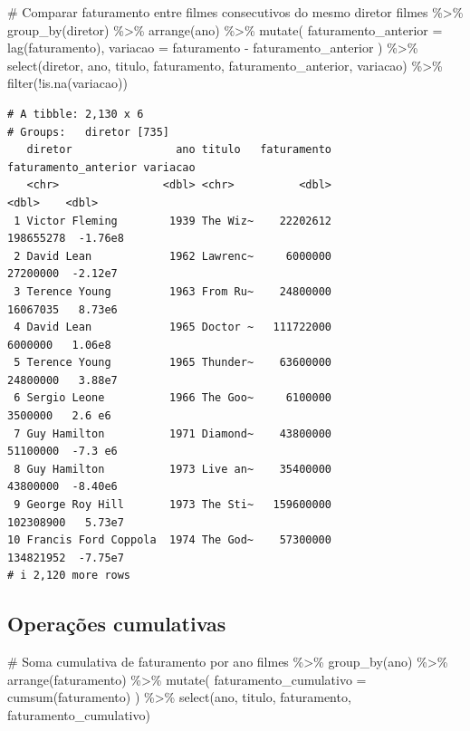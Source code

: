 \documentclass[
  letterpaper,
]{scrbook}
\newenvironment{Shaded}{\begin{snugshade}}{\end{snugshade}}
\newcommand{\AttributeTok}[1]{\textcolor[rgb]{0.40,0.45,0.13}{#1}}
\newcommand{\CommentTok}[1]{\textcolor[rgb]{0.37,0.37,0.37}{#1}}
\newcommand{\FunctionTok}[1]{\textcolor[rgb]{0.28,0.35,0.67}{#1}}
\newcommand{\NormalTok}[1]{\textcolor[rgb]{0.00,0.23,0.31}{#1}}
\newcommand{\SpecialCharTok}[1]{\textcolor[rgb]{0.37,0.37,0.37}{#1}}
\begin{document}
\begin{Shaded}
\begin{Highlighting}[]
\CommentTok{\# Comparar faturamento entre filmes consecutivos do mesmo diretor}
\NormalTok{filmes }\SpecialCharTok{\%\textgreater{}\%} 
  \FunctionTok{group\_by}\NormalTok{(diretor) }\SpecialCharTok{\%\textgreater{}\%} 
  \FunctionTok{arrange}\NormalTok{(ano) }\SpecialCharTok{\%\textgreater{}\%} 
  \FunctionTok{mutate}\NormalTok{(}
    \AttributeTok{faturamento\_anterior =} \FunctionTok{lag}\NormalTok{(faturamento),}
    \AttributeTok{variacao =}\NormalTok{ faturamento }\SpecialCharTok{{-}}\NormalTok{ faturamento\_anterior}
\NormalTok{  ) }\SpecialCharTok{\%\textgreater{}\%} 
  \FunctionTok{select}\NormalTok{(diretor, ano, titulo, faturamento, faturamento\_anterior, variacao) }\SpecialCharTok{\%\textgreater{}\%} 
  \FunctionTok{filter}\NormalTok{(}\SpecialCharTok{!}\FunctionTok{is.na}\NormalTok{(variacao))}
\end{Highlighting}
\end{Shaded}

\begin{verbatim}
# A tibble: 2,130 x 6
# Groups:   diretor [735]
   diretor                ano titulo   faturamento faturamento_anterior variacao
   <chr>                <dbl> <chr>          <dbl>                <dbl>    <dbl>
 1 Victor Fleming        1939 The Wiz~    22202612            198655278  -1.76e8
 2 David Lean            1962 Lawrenc~     6000000             27200000  -2.12e7
 3 Terence Young         1963 From Ru~    24800000             16067035   8.73e6
 4 David Lean            1965 Doctor ~   111722000              6000000   1.06e8
 5 Terence Young         1965 Thunder~    63600000             24800000   3.88e7
 6 Sergio Leone          1966 The Goo~     6100000              3500000   2.6 e6
 7 Guy Hamilton          1971 Diamond~    43800000             51100000  -7.3 e6
 8 Guy Hamilton          1973 Live an~    35400000             43800000  -8.40e6
 9 George Roy Hill       1973 The Sti~   159600000            102308900   5.73e7
10 Francis Ford Coppola  1974 The God~    57300000            134821952  -7.75e7
# i 2,120 more rows
\end{verbatim}

\subsection{Operações cumulativas}\label{operauxe7uxf5es-cumulativas}

\begin{Shaded}
\begin{Highlighting}[]
\CommentTok{\# Soma cumulativa de faturamento por ano}
\NormalTok{filmes }\SpecialCharTok{\%\textgreater{}\%} 
  \FunctionTok{group\_by}\NormalTok{(ano) }\SpecialCharTok{\%\textgreater{}\%} 
  \FunctionTok{arrange}\NormalTok{(faturamento) }\SpecialCharTok{\%\textgreater{}\%} 
  \FunctionTok{mutate}\NormalTok{(}
    \AttributeTok{faturamento\_cumulativo =} \FunctionTok{cumsum}\NormalTok{(faturamento)}
\NormalTok{  ) }\SpecialCharTok{\%\textgreater{}\%} 
  \FunctionTok{select}\NormalTok{(ano, titulo, faturamento, faturamento\_cumulativo)}
\end{Highlighting}
\end{Shaded}
\end{document}
